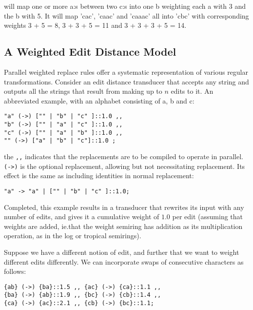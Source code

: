 \documentclass{llncs}
\begin{document}
will map one or more a:s between two c:s into one b weighting each a with 3
and the b with 5. It will map 'cac', 'caac' and 'caaac' all into 'cbc' with
corresponding weights 3 + 5 = 8, 3 + 3 + 5 = 11 and 3 + 3 + 3 + 5 = 14.

\subsection{A Weighted Edit Distance Model}

Parallel weighted replace rules offer a systematic representation of various
regular transformations. Consider an edit distance transducer that accepts
any string and outputs all the strings that result from making up to $n$ edits
to it. An abbreviated example, with an alphabet consisting of a, b and c:

\begin{framed}
\begin{verbatim}
"a" (->) ["" | "b" | "c" ]::1.0 ,,
"b" (->) ["" | "a" | "c" ]::1.0 ,,
"c" (->) ["" | "a" | "b" ]::1.0 ,,
"" (->) ["a" | "b" | "c"]::1.0 ;
\end{verbatim}
\end{framed}

the \verb+,,+ indicates that the replacements are to be compiled to operate
in parallel. \verb+(->)+ is the optional replacement, allowing but not
necessitating replacement. Its effect is the same as including identities
in normal replacement:

\begin{framed}
\begin{verbatim}
"a" -> "a" | ["" | "b" | "c" ]::1.0;
\end{verbatim}
\end{framed}

Completed, this example results in a transducer that rewrites
its input with any number of edits, and gives it a cumulative weight of
$1.0$ per edit (assuming that weights are added, ie.\@ that the weight semiring
has addition as its multiplication operation, as in the log or tropical
semirings).

Suppose we have a different notion of edit, and further that we want to weight
different edits differently. We can incorporate swaps of consecutive
characters as follows:

\begin{framed}
\begin{verbatim}
{ab} (->) {ba}::1.5 ,, {ac} (->) {ca}::1.1 ,,
{ba} (->) {ab}::1.9 ,, {bc} (->) {cb}::1.4 ,,
{ca} (->) {ac}::2.1 ,, {cb} (->) {bc}::1.1;
\end{verbatim}
\end{framed}
\end{document}
